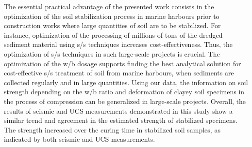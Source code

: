 \documentclass[sustainability,article,accept,pdftex,moreauthors]{Definitions/mdpi}
\begin{document}
{{The essential practical advantage of the presented work consists in the optimization of {the }soil stabilization process in marine harbours {prior to construction works where large quantities of soil are to be stabilized. For instance, optimization of the processing of }millions of tons of the dredged sediment material {using} s/s techniques {increases cost-effectiveness}. Thus, the optimization of s/s techniques in such large-scale projects is crucial. The optimization of {the} w/b dosage supports finding the best analytical solution for cost-effective s/s treatment of soil from marine harbours, when sediments are collected regularly and in large quantities. Using our data, the information on soil strength depending on {the} w/b ratio and deformation of clayey soil specimens in the process of compression can be generalized in large-scale projects. {Overall, the results of seismic and UCS measurements demonstrated in this study show a similar trend and agreement in the estimated strength of stabilized specimens. The strength increased over the curing time in stabilized soil samples, as indicated by both seismic and UCS measurements.} %
\vspace{6pt}







}}
\end{document}
